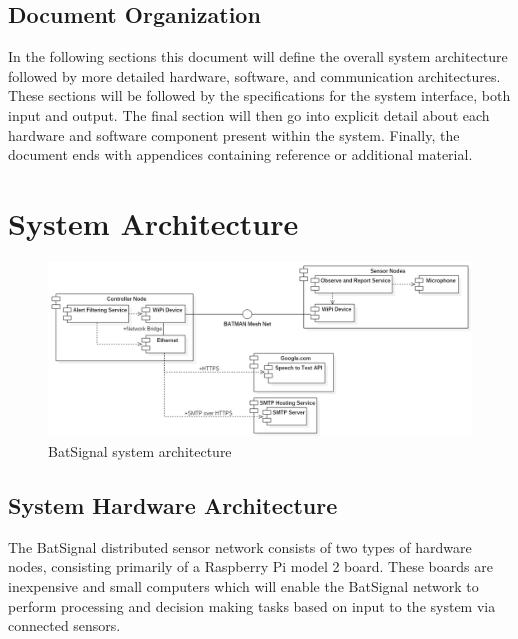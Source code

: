 \documentclass[11pt,a4paper]{article}
\begin{document}
\subsection{Document Organization}
In the following sections this document will define the overall system architecture followed by more detailed hardware, software, and communication architectures. These sections will be followed by the specifications for the system interface, both input and output. The final section will then go into explicit detail about each hardware and software component present within the system. Finally, the document ends with appendices containing reference or additional material. 

\section{System Architecture}
\begin{figure}[H]
	\centering
		\includegraphics[width=\textwidth, keepaspectratio=true]{Graphics/SystemArchitecture.png}
	\caption{BatSignal system architecture}
\end{figure}

\subsection{System Hardware Architecture}
The BatSignal distributed sensor network consists of two types of hardware nodes, consisting primarily of a Raspberry Pi model 2 board. These boards are inexpensive and small computers which will enable the BatSignal network to perform processing and decision making tasks based on input to the system via connected sensors. 
\end{document}
